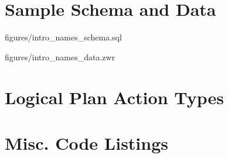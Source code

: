 \documentclass[]{article}
\begin{document}


\appendix
\appendixpage
\addappheadtotoc

\section{Sample Schema and Data}


{figures/intro_names_schema.sql}


{figures/intro_names_data.zwr}

\section{Logical Plan Action Types}



\section{Misc. Code Listings}











\end{document}
